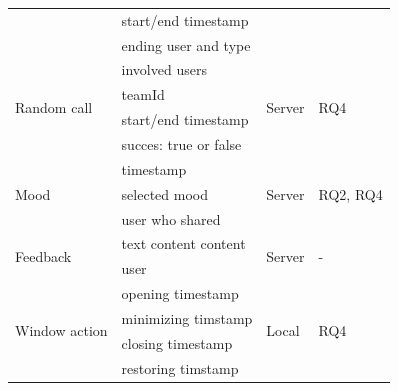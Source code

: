 \begin{table}[h]
\begin{tabularx}{.9\textwidth}{l X l l}
                                             & start/end timestamp                    &                         &                               \\
                                             & ending user and type                   &                         &                               \\
        \midrule
        \multirow{4}{*}{Random call}         & involved users                         & \multirow{4}{*}{Server} & \multirow{4}{*}{RQ4}          \\
                                             & teamId                                 &                         &                               \\
                                             & start/end timestamp                    &                         &                               \\
                                             & succes: true or false                  &                         &                               \\
        \midrule
        \multirow{3}{*}{Mood}                & timestamp                              & \multirow{3}{*}{Server} & \multirow{3}{*}{RQ2, RQ4}     \\
                                             & selected mood                          &                         &                               \\
                                             & user who shared                        &                         &                               \\
        \midrule
        \multirow{2}{*}{Feedback}            & text content content                   & \multirow{2}{*}{Server} & \multirow{2}{*}{-}            \\
                                             & user                                   &                         &                               \\
        \midrule
        \multirow{4}{*}{Window action}       & opening timestamp                      & \multirow{4}{*}{Local}  & \multirow{4}{*}{RQ4    }      \\
                                             & minimizing timstamp                    &                         &                               \\
                                             & closing timestamp                      &                         &                               \\
                                             & restoring timstamp                     &                         &                               \\


\end{tabularx}
\end{table}
